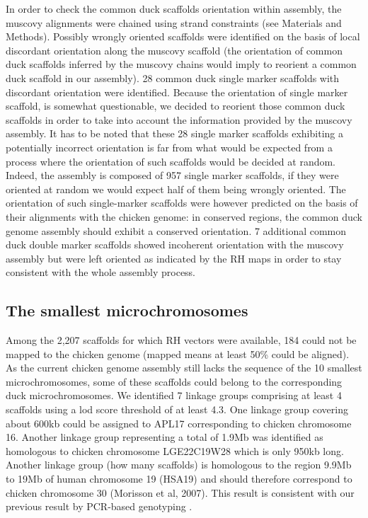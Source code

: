\documentclass[10pt,letterpaper]{article}
\begin{document}
In order to check the common duck scaffolds orientation within assembly, the muscovy alignments were chained using strand constraints (see Materials and Methods). 
Possibly wrongly oriented scaffolds were identified on the basis of local discordant orientation along the muscovy scaffold (the orientation of common duck scaffolds inferred by the muscovy chains would imply to reorient a common duck scaffold in our assembly). 
28 common duck single marker scaffolds with discordant orientation were identified. 
Because the orientation of single marker scaffold, is somewhat questionable, we decided to reorient those common duck scaffolds in order to take into account the information provided by the muscovy assembly. 
It has to be noted that these 28 single marker scaffolds exhibiting a potentially incorrect orientation is far from what would be expected from a process where the orientation of such scaffolds would be decided at random. 
Indeed, the assembly is composed of 957 single marker scaffolds, if they were oriented at random we would expect half of them being wrongly oriented. 
The orientation of such single-marker scaffolds were however predicted on the basis of their alignments with the chicken genome: in conserved regions, the common duck genome assembly should exhibit a conserved orientation. 
7 additional common duck double marker scaffolds showed incoherent orientation with the muscovy assembly but were left oriented as indicated by the RH maps in order to stay consistent with the whole assembly process.

\subsection*{The smallest microchromosomes}

Among the 2,207 scaffolds for which RH vectors were available, 184 could not be mapped to the chicken genome (mapped means at least 50\% could be aligned). 
As the current chicken genome assembly still lacks the sequence of the 10 smallest microchromosomes, some of these scaffolds could belong to the corresponding duck microchromosomes. 
We identified 7 linkage groups comprising at least 4 scaffolds using a lod score threshold of at least 4.3. One linkage group covering about 600kb could be assigned to APL17 corresponding to chicken chromosome 16.
Another linkage group representing a total of 1.9Mb was identified as homologous to chicken chromosome LGE22C19W28 which is only 950kb long. 
Another linkage group (how many scaffolds) is homologous to the region 9.9Mb to 19Mb of human chromosome 19 (HSA19) and should therefore correspond to chicken chromosome 30 (Morisson et al, 2007). 
This result is consistent with our previous result by PCR-based genotyping \cite{Rao2012}. 
\end{document}
